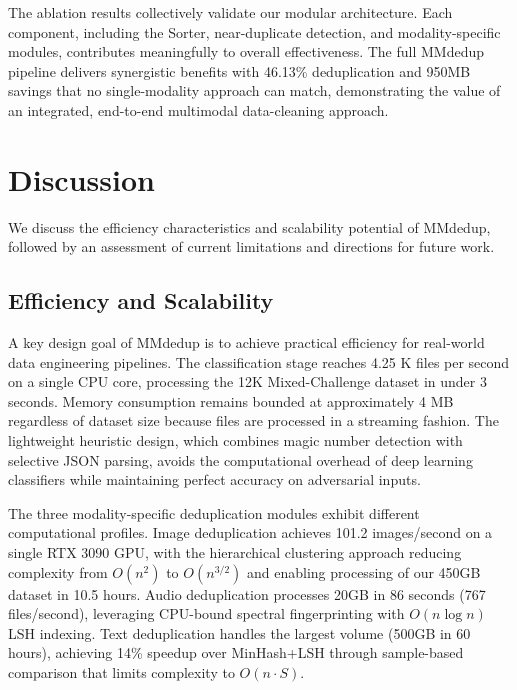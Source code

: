 \documentclass[sigconf, nonacm]{acmart}
\begin{document}
The ablation results collectively validate our modular architecture. Each component, including the Sorter, near-duplicate detection, and modality-specific modules, contributes meaningfully to overall effectiveness. The full MMdedup pipeline delivers synergistic benefits with 46.13\% deduplication and 950MB savings that no single-modality approach can match, demonstrating the value of an integrated, end-to-end multimodal data-cleaning approach.


\vspace{-2mm}
\section{Discussion}
\label{sec:discussion}

We discuss the efficiency characteristics and scalability potential of MMdedup, followed by an assessment of current limitations and directions for future work.

\vspace{-2mm}
\subsection{Efficiency and Scalability}


A key design goal of MMdedup is to achieve practical efficiency for real-world data engineering pipelines. The classification stage reaches 4.25 K files per second on a single CPU core, processing the 12K Mixed-Challenge dataset in under 3 seconds. Memory consumption remains bounded at approximately 4 MB regardless of dataset size because files are processed in a streaming fashion. The lightweight heuristic design, which combines magic number detection with selective JSON parsing, avoids the computational overhead of deep learning classifiers while maintaining perfect accuracy on adversarial inputs.


The three modality-specific deduplication modules exhibit different computational profiles. Image deduplication achieves 101.2 images/second on a single RTX 3090 GPU, with the hierarchical clustering approach reducing complexity from $O(n^2)$ to $O(n^{3/2})$ and enabling processing of our 450GB dataset in 10.5 hours. Audio deduplication processes 20GB in 86 seconds (767 files/second), leveraging CPU-bound spectral fingerprinting with $O(n \log n)$ LSH indexing. Text deduplication handles the largest volume (500GB in 60 hours), achieving 14\% speedup over MinHash+LSH through sample-based comparison that limits complexity to $O(n \cdot S)$.
\end{document}

